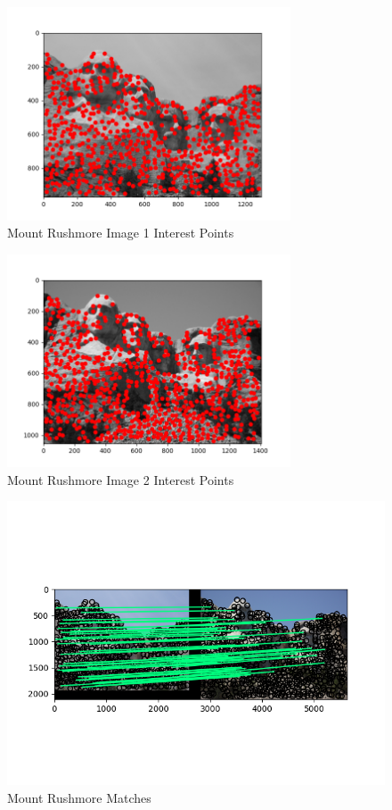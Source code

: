 \documentclass{article}
\begin{document}
\begin{figure}[H] %
    \centering
    \includegraphics[width=0.75\textwidth]{images/mount_rushmore_figure_1_points.png} %
    \caption{Mount Rushmore Image 1 Interest Points}
    \label{fig:m_rushmore_1}
\end{figure}
\begin{figure}[H]
    \centering
    \includegraphics[width=0.75\textwidth]{images/mount_rushmore_figure_2_points.png} %
    \caption{Mount Rushmore Image 2 Interest Points}
    \label{fig:m_rushmore_2}
\end{figure}
\begin{figure}[H]
    \centering
    \includegraphics[width=\textwidth]{images/mount_rushmore_matches.png} %
    \caption{Mount Rushmore Matches}
    \label{fig:m_rushmore_match}
\end{figure}
\end{document}
